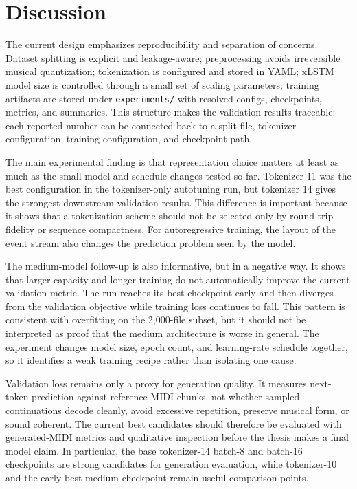 \section{Discussion}

The current design emphasizes reproducibility and separation of concerns.
Dataset splitting is explicit and leakage-aware; preprocessing avoids irreversible
musical quantization; tokenization is configured and stored in YAML; xLSTM model
size is controlled through a small set of scaling parameters; training artifacts
are stored under \verb|experiments/| with resolved configs, checkpoints, metrics,
and summaries. This structure makes the validation results traceable: each
reported number can be connected back to a split file, tokenizer configuration,
training configuration, and checkpoint path.

The main experimental finding is that representation choice matters at least as
much as the small model and schedule changes tested so far. Tokenizer 11 was the
best configuration in the tokenizer-only autotuning run, but tokenizer 14 gives
the strongest downstream validation results. This difference is important because
it shows that a tokenization scheme should not be selected only by round-trip
fidelity or sequence compactness. For autoregressive training, the layout of the
event stream also changes the prediction problem seen by the model.

The medium-model follow-up is also informative, but in a negative way. It shows
that larger capacity and longer training do not automatically improve the current
validation metric. The run reaches its best checkpoint early and then diverges
from the validation objective while training loss continues to fall. This pattern
is consistent with overfitting on the 2,000-file subset, but it should not be
interpreted as proof that the medium architecture is worse in general. The
experiment changes model size, epoch count, and learning-rate schedule together,
so it identifies a weak training recipe rather than isolating one cause.

Validation loss remains only a proxy for generation quality. It measures
next-token prediction against reference MIDI chunks, not whether sampled
continuations decode cleanly, avoid excessive repetition, preserve musical form,
or sound coherent. The current best candidates should therefore be evaluated
with generated-MIDI metrics and qualitative inspection before the thesis makes a
final model claim. In particular, the base tokenizer-14 batch-8 and batch-16
checkpoints are strong candidates for generation evaluation, while tokenizer-10
and the early best medium checkpoint remain useful comparison points.

